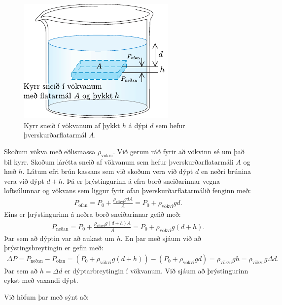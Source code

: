 \begin{minipage}{\linewidth}
\begin{figure}
    \centering
    \includegraphics{figures/thykkt.pdf}
    \caption{Kyrr sneið í vökvanum af þykkt $h$ á dýpi $d$ sem hefur þverskurðarflatarmál $A$.}
    \label{fig:dummythick}
\end{figure}

Skoðum vökva með eðlismassa $\rho_{\text{vökvi}}$. Við gerum ráð fyrir að vökvinn sé um það bil kyrr. Skoðum lárétta sneið af vökvanum sem hefur þverskurðarflatarmáli $A$ og hæð $h$. Látum efri brún kassans sem við skoðum vera við dýpt $d$ en neðri brúnina vera við dýpt $d+h$. Þá er þrýstingurinn á efra borð sneiðarinnar vegna loftsúlunnar og vökvans sem liggur fyrir ofan þverskurðarflatarmálið fenginn með:
\begin{align*}
    P_{\text{ofan}} = P_0 + \frac{\rho_{\text{vökvi}}gdA}{A} = P_0 + \rho_{\text{vökvi}}gd.
\end{align*}
Eins er þrýstingurinn á neðra borð sneiðarinnar gefið með:
\begin{align*}
    P_{\text{neðan}} = P_0 + \frac{\rho_{\text{vökvi}}g(d+h)A}{A} = P_0 + \rho_{\text{vökvi}}g(d+h).
\end{align*}
Þar sem að dýptin var að aukast um $h$. En þar með sjáum við að þrýstingsbreytingin er gefin með:
\begin{align*}
    \Delta P = P_{\text{neðan}} - P_{\text{ofan}} = \left( P_0 + \rho_{\text{vökvi}}g(d+h) \right) -  \left( P_0 + \rho_{\text{vökvi}}gd \right) = \rho_{\text{vökvi}}gh = \rho_{\text{vökvi}}g\Delta d.
\end{align*}
Þar sem að $h = \Delta d$ er dýptarbreytingin í vökvanum. Við sjáum að þrýstingurinn eykst með vaxandi dýpt.

Við höfum þar með sýnt að:

\end{minipage}


